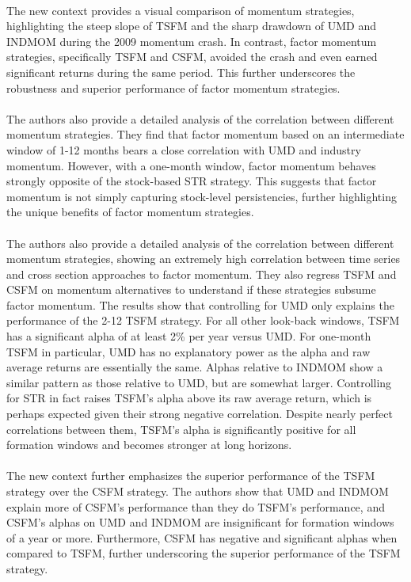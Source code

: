 \documentclass{article}
\begin{document}
\\
The new context provides a visual comparison of momentum strategies, highlighting the steep slope of TSFM and the sharp drawdown of UMD and INDMOM during the 2009 momentum crash. In contrast, factor momentum strategies, specifically TSFM and CSFM, avoided the crash and even earned significant returns during the same period. This further underscores the robustness and superior performance of factor momentum strategies. \\
\\
The authors also provide a detailed analysis of the correlation between different momentum strategies. They find that factor momentum based on an intermediate window of 1-12 months bears a close correlation with UMD and industry momentum. However, with a one-month window, factor momentum behaves strongly opposite of the stock-based STR strategy. This suggests that factor momentum is not simply capturing stock-level persistencies, further highlighting the unique benefits of factor momentum strategies. \\
\\
The authors also provide a detailed analysis of the correlation between different momentum strategies, showing an extremely high correlation between time series and cross section approaches to factor momentum. They also regress TSFM and CSFM on momentum alternatives to understand if these strategies subsume factor momentum. The results show that controlling for UMD only explains the performance of the 2-12 TSFM strategy. For all other look-back windows, TSFM has a significant alpha of at least 2\% per year versus UMD. For one-month TSFM in particular, UMD has no explanatory power as the alpha and raw average returns are essentially the same. Alphas relative to INDMOM show a similar pattern as those relative to UMD, but are somewhat larger. Controlling for STR in fact raises TSFM’s alpha above its raw average return, which is perhaps expected given their strong negative correlation. Despite nearly perfect correlations between them, TSFM’s alpha is significantly positive for all formation windows and becomes stronger at long horizons. \\
\\
The new context further emphasizes the superior performance of the TSFM strategy over the CSFM strategy. The authors show that UMD and INDMOM explain more of CSFM’s performance than they do TSFM’s performance, and CSFM’s alphas on UMD and INDMOM are insignificant for formation windows of a year or more. Furthermore, CSFM has negative and significant alphas when compared to TSFM, further underscoring the superior performance of the TSFM strategy. \\
\end{document}
